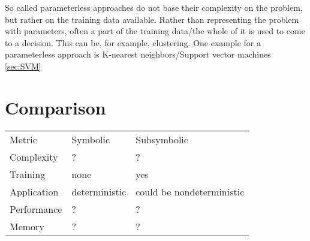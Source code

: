 So called parameterless approaches do not base their complexity on the problem, but rather on the training data available. Rather than representing the problem with parameters, often a part of the training data/the whole of it is used to come to a decision. This can be, for example, clustering.
One example for a parameterless approach is K-nearest neighbors/Support vector machines \autoref{sec:SVM}

\section{Comparison}
\begin{tabular}{l p{} p{}}
    Metric      & Symbolic  & Subsymbolic\\
    Complexity  & ? & ? \\
    Training    & none & yes \\
    Application & deterministic&could be nondeterministic\\
    Performance & ? & ? \\
    Memory      & ? & ? \\
\end{tabular}






